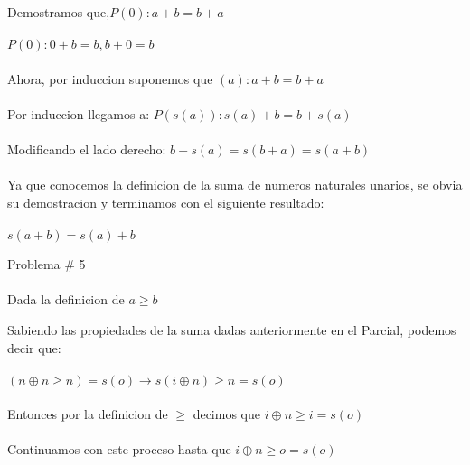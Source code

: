 \documentclass[]{article}
\begin{document}
\begin{center}
Demostramos que,$P(0): a + b = b + a$\\~\\
$P(0): 0 + b = b, b + 0 = b$\\~\\
Ahora, por induccion suponemos que $(a): a + b = b + a$\\~\\
Por induccion llegamos a: $P(s(a)): s(a) + b = b + s(a)$\\~\\
Modificando el lado derecho: $b + s(a)= s(b + a)= s(a + b)$\\~\\
Ya que conocemos la definicion de la suma de numeros naturales unarios, se obvia su demostracion y terminamos con el siguiente resultado:\\~\\
$s(a + b)= s(a) + b$\\
\end{center}
\Large
Problema \# 5\\~\\
\normalsize
Dada la definicion de $a \geq b$\\
\begin{center}
Sabiendo las propiedades de la suma dadas anteriormente en el Parcial, podemos decir que:\\~\\
$(n \oplus n \geq n) = s(o) \rightarrow s(i \oplus n) \geq n = s(o)$\\~\\
Entonces por la definicion de $\geq$ decimos que $i \oplus n \geq i = s(o)$\\~\\
Continuamos con este proceso hasta que $i \oplus n \geq o = s(o)$
\end{center}
\end{document}
